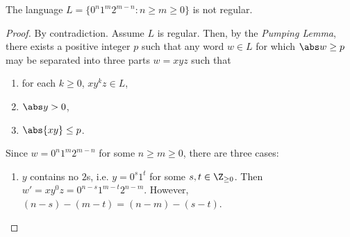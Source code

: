 \documentclass{article}
\begin{document}
\begin{claim}
    The language $L=\{0^n1^m2^{m-n}:n\geq m\geq 0\}$ is not regular.
\end{claim}
\begin{proof}
    By contradiction. Assume $L$ is regular. Then, by the \emph{Pumping Lemma},
    there exists a positive integer $p$ such that any word $w\in L$ for which
    $\abs w \geq p$ may be separated into three parts $w=xyz$ such that 
    \begin{enumerate}[label=P\arabic*.]
        \item for each $k \geq 0$, $xy^kz\in L$,
        \item $\abs y > 0$,
        \item $\abs{xy}\leq p$.
    \end{enumerate}
    Since $w=0^n1^m2^{m-n}$ for some $n\geq m\geq 0$, there are three cases:
    \begin{enumerate}
        \item $y$ contains no $2$s, i.e. $y=0^s1^t$ for some $s,t\in\Z_{\geq 0}$.
            Then $w'=xy^0z=0^{n-s}1^{m-t}2^{n-m}$. However, $(n-s)-(m-t)=(n-m)-(s-t)$.
    \end{enumerate}
\end{proof}
\end{document}
